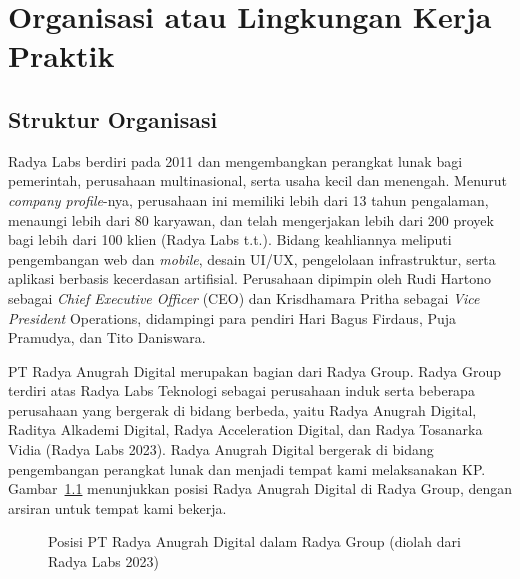 \chapter{Organisasi atau Lingkungan Kerja Praktik}

\section{Struktur Organisasi}
Radya Labs berdiri pada 2011 dan mengembangkan perangkat lunak bagi pemerintah, perusahaan multinasional, serta usaha kecil dan menengah. Menurut \textit{company profile}-nya, perusahaan ini memiliki lebih dari 13 tahun pengalaman, menaungi lebih dari 80 karyawan, dan telah mengerjakan lebih dari 200 proyek bagi lebih dari 100 klien (Radya Labs t.t.). Bidang keahliannya meliputi pengembangan web dan \textit{mobile}, desain UI/UX, pengelolaan infrastruktur, serta aplikasi berbasis kecerdasan artifisial. Perusahaan dipimpin oleh Rudi Hartono sebagai \textit{Chief Executive Officer}\label{ist:ceo} (CEO) dan Krisdhamara Pritha sebagai \textit{Vice President} Operations, didampingi para pendiri Hari Bagus Firdaus, Puja Pramudya, dan Tito Daniswara.

PT Radya Anugrah Digital merupakan bagian dari Radya Group. Radya Group terdiri atas Radya Labs Teknologi sebagai perusahaan induk serta beberapa perusahaan yang bergerak di bidang berbeda, yaitu Radya Anugrah Digital, Raditya Alkademi Digital, Radya Acceleration Digital, dan Radya Tosanarka Vidia (Radya Labs 2023). Radya Anugrah Digital bergerak di bidang pengembangan perangkat lunak dan menjadi tempat kami melaksanakan KP. Gambar~\ref{fig:struktur-grup} menunjukkan posisi Radya Anugrah Digital di Radya Group, dengan arsiran untuk tempat kami bekerja.

\begin{figure}[H]
\centering
{}
\caption{Posisi PT Radya Anugrah Digital dalam Radya Group (diolah dari Radya Labs 2023)}
\label{fig:struktur-grup}
\end{figure}

